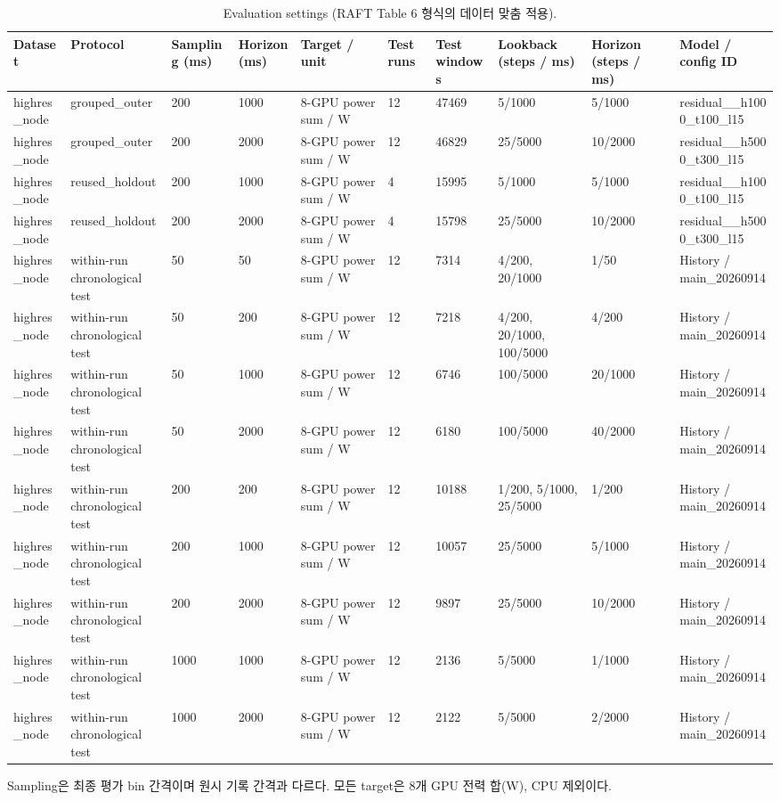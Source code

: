 \begin{table}[t]
\centering
\caption{Evaluation settings (RAFT Table 6 형식의 데이터 맞춤 적용).}
\label{tab:a1_evaluation_settings}
\small
\begin{tabular}{llllllllll}
\toprule
Dataset & Protocol & Sampling (ms) & Horizon (ms) & Target / unit & Test runs & Test windows & Lookback (steps / ms) & Horizon (steps / ms) & Model / config ID \\
\midrule
highres\_node & grouped\_outer & 200 & 1000 & 8-GPU power sum / W & 12 & 47469 & 5/1000 & 5/1000 & residual\_\_h1000\_t100\_l15 \\
highres\_node & grouped\_outer & 200 & 2000 & 8-GPU power sum / W & 12 & 46829 & 25/5000 & 10/2000 & residual\_\_h5000\_t300\_l15 \\
highres\_node & reused\_holdout & 200 & 1000 & 8-GPU power sum / W & 4 & 15995 & 5/1000 & 5/1000 & residual\_\_h1000\_t100\_l15 \\
highres\_node & reused\_holdout & 200 & 2000 & 8-GPU power sum / W & 4 & 15798 & 25/5000 & 10/2000 & residual\_\_h5000\_t300\_l15 \\
highres\_node & within-run chronological test & 50 & 50 & 8-GPU power sum / W & 12 & 7314 & 4/200, 20/1000 & 1/50 & History / main\_20260914 \\
highres\_node & within-run chronological test & 50 & 200 & 8-GPU power sum / W & 12 & 7218 & 4/200, 20/1000, 100/5000 & 4/200 & History / main\_20260914 \\
highres\_node & within-run chronological test & 50 & 1000 & 8-GPU power sum / W & 12 & 6746 & 100/5000 & 20/1000 & History / main\_20260914 \\
highres\_node & within-run chronological test & 50 & 2000 & 8-GPU power sum / W & 12 & 6180 & 100/5000 & 40/2000 & History / main\_20260914 \\
highres\_node & within-run chronological test & 200 & 200 & 8-GPU power sum / W & 12 & 10188 & 1/200, 5/1000, 25/5000 & 1/200 & History / main\_20260914 \\
highres\_node & within-run chronological test & 200 & 1000 & 8-GPU power sum / W & 12 & 10057 & 25/5000 & 5/1000 & History / main\_20260914 \\
highres\_node & within-run chronological test & 200 & 2000 & 8-GPU power sum / W & 12 & 9897 & 25/5000 & 10/2000 & History / main\_20260914 \\
highres\_node & within-run chronological test & 1000 & 1000 & 8-GPU power sum / W & 12 & 2136 & 5/5000 & 1/1000 & History / main\_20260914 \\
highres\_node & within-run chronological test & 1000 & 2000 & 8-GPU power sum / W & 12 & 2122 & 5/5000 & 2/2000 & History / main\_20260914 \\
\bottomrule
\end{tabular}
\vspace{2pt}\par\footnotesize Sampling은 최종 평가 bin 간격이며 원시 기록 간격과 다르다. 모든 target은 8개 GPU 전력 합(W), CPU 제외이다.
\end{table}
